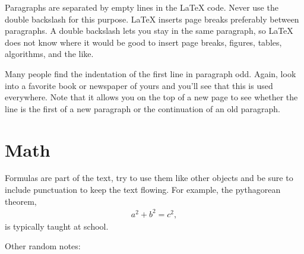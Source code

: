 \documentclass[12pt, %
a4paper, %
twoside, %
openright, %
abstract=on, %
DIV=11,      %
BCOR=8mm]{scrbook} %
\begin{document}
    Paragraphs are separated  by empty lines in the  \LaTeX{} code.  Never 
    use  the double  backslash for  this purpose.   \LaTeX{} inserts  page 
    breaks  preferably between  paragraphs.  A  double backslash  lets you 
    stay in the  same paragraph, so \LaTeX{} does not  know where it would 
    be good  to insert page  breaks, figures, tables, algorithms,  and the 
    like.                                                                  

    Many people find  the indentation of the first line  in paragraph odd. 
    Again, look into a favorite book  or newspaper of yours and you'll see 
    that this is used everywhere.  Note that it allows you on the top of a 
    new page to  see whether the line  is the first of a  new paragraph or 
    the continuation of an old paragraph. 

    \section{Math}

    Formulas are part of  the text, try to use them  like other objects and
    be sure to include punctuation to keep the text flowing.  For example,
    the pythagorean theorem,
    \begin{align}
        a^2 + b^2 = c^2,
    \end{align}
    is typically taught at school.

    Other random notes:
\end{document}
